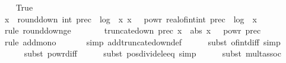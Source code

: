 \begin{isabellebody}
\ \ \isamarkupfalse%
\ True\isanewline
\ \ \isamarkupfalse%
\ {\isachardoublequoteopen}x\ {\isasymle}\ round{\isacharunderscore}{\kern0pt}down\ {\isacharparenleft}{\kern0pt}int\ prec\ {\isacharminus}{\kern0pt}\ {\isasymlfloor}log\ {}\ {\isasymbar}x{\isasymbar}{\isasymrfloor}{\isacharparenright}{\kern0pt}\ x\ {\isacharplus}{\kern0pt}\ {}\ powr\ {\isacharparenleft}{\kern0pt}{\isacharminus}{\kern0pt}real{\isacharunderscore}{\kern0pt}of{\isacharunderscore}{\kern0pt}int{\isacharparenleft}{\kern0pt}int\ prec\ {\isacharminus}{\kern0pt}\ {\isasymlfloor}log\ {}\ {\isasymbar}x{\isasymbar}{\isasymrfloor}{\isacharparenright}{\kern0pt}{\isacharparenright}{\kern0pt}{\isachardoublequoteclose}\isanewline
\ \ \ \ \isamarkupfalse%
\ {\isacharparenleft}{\kern0pt}rule\ round{\isacharunderscore}{\kern0pt}down{\isacharunderscore}{\kern0pt}ge{\isacharparenright}{\kern0pt}\isanewline
\ \ \isamarkupfalse%
\ \isamarkupfalse%
\ {\isachardoublequoteopen}{\isachardot}{\kern0pt}{\isachardot}{\kern0pt}{\isachardot}{\kern0pt}\ {\isasymle}\ truncate{\isacharunderscore}{\kern0pt}down\ prec\ x\ {\isacharplus}{\kern0pt}\ abs\ x\ {\isacharasterisk}{\kern0pt}\ {}\ powr\ {\isacharparenleft}{\kern0pt}{\isacharminus}{\kern0pt}prec{\isacharparenright}{\kern0pt}{\isachardoublequoteclose}\isanewline
\ \ \ \ \isamarkupfalse%
\ {\isacharparenleft}{\kern0pt}rule\ add{\isacharunderscore}{\kern0pt}mono{\isacharparenright}{\kern0pt}\isanewline
\ \ \ \ \ \isamarkupfalse%
\ {\isacharparenleft}{\kern0pt}simp\ add{\isacharcolon}{\kern0pt}truncate{\isacharunderscore}{\kern0pt}down{\isacharunderscore}{\kern0pt}def{\isacharparenright}{\kern0pt}\isanewline
\ \ \ \ \isamarkupfalse%
\ {\isacharparenleft}{\kern0pt}subst\ of{\isacharunderscore}{\kern0pt}int{\isacharunderscore}{\kern0pt}diff{\isacharcomma}{\kern0pt}\ simp{\isacharparenright}{\kern0pt}\isanewline
\ \ \ \ \isamarkupfalse%
\ {\isacharparenleft}{\kern0pt}subst\ powr{\isacharunderscore}{\kern0pt}diff{\isacharparenright}{\kern0pt}\isanewline
\ \ \ \ \isamarkupfalse%
\ {\isacharparenleft}{\kern0pt}subst\ pos{\isacharunderscore}{\kern0pt}divide{\isacharunderscore}{\kern0pt}le{\isacharunderscore}{\kern0pt}eq{\isacharcomma}{\kern0pt}\ simp{\isacharparenright}{\kern0pt}\isanewline
\ \ \ \ \isamarkupfalse%
\ {\isacharparenleft}{\kern0pt}subst\ mult{\isachardot}{\kern0pt}assoc{\isacharparenright}{\kern0pt}\isanewline
\ \ \ \ \isamarkupfalse%

\end{isabellebody}
